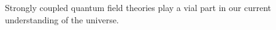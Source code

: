 
Strongly coupled quantum field theories play a vial part in our current understanding of the universe.

